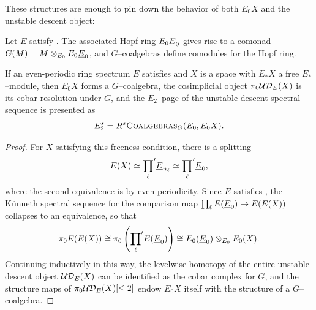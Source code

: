 These structures are enough to pin down the behavior of both \(E_0 X\) and the unstable descent object:

\begin{definition}
Let \(E\) satisfy {\UFH}.
The associated Hopf ring \(E_0 \OS{E}{0}\) gives rise to a comonad \(G(M) = M \otimes_{E_0} E_0 \OS{E}{0}\), and \(G\)--coalgebras define comodules for the Hopf ring.
\end{definition}

\begin{lemma}\label{HopfRingFromOneRingSpectrum}
If an even-periodic ring spectrum \(E\) satisfies {\UFH} and \(X\) is a space with \(E_* X\) a free \(E_*\)--module, then \(E_0 X\) forms a \(G\)--coalgebra, the cosimplicial object \(\pi_0 \mathcal{UD}_E(X)\) is its cobar resolution under \(G\), and the \(E_2\)--page of the unstable descent spectral sequence is presented as \[E_2^{s} = R^s\normalfont\textsc{Coalgebras}_G(E_0, E_0 X).\]
\end{lemma}
\begin{proof}
For \(X\) satisfying this freeness condition, there is a splitting \[E(X) \simeq {\prod_\ell}' \OS{E}{n_\ell} \simeq {\prod_\ell}' \OS{E}{0},\] where the second equivalence is by even-periodicity.
Since \(E\) satisfies {\UFH}, the K\"unneth spectral sequence for the comparison map \(\prod_\ell E(\OS{E}{0}) \to E(E(X))\) collapses to an equivalence, so that \[\pi_0 E(E(X)) \cong \pi_0 \left({\prod_\ell}' E(\OS{E}{0})\right) \cong E_0(\OS{E}{0}) \otimes_{E_0} E_0(X).\]
Continuing inductively in this way, the levelwise homotopy of the entire unstable descent object \(\mathcal{UD}_E(X)\) can be identified as the cobar complex for \(G\), and the structure maps of \(\pi_0 \mathcal{UD}_E(X)[\le 2]\) endow \(E_0 X\) itself with the structure of a \(G\)--coalgebra.
\end{proof}

